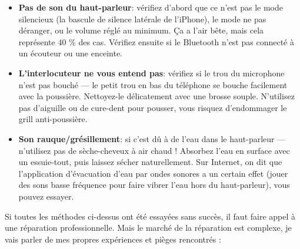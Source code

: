 \begin{itemize}
  \item \textbf{Pas de son du haut-parleur}: vérifiez d'abord que ce n'est pas le mode silencieux (la bascule de silence latérale de l'iPhone), le mode ne pas déranger, ou le volume réglé au minimum. Ça a l'air bête, mais cela représente 40 \% des cas. Vérifiez ensuite si le Bluetooth n'est pas connecté à un écouteur ou une enceinte.
  \item \textbf{L'interlocuteur ne vous entend pas}: vérifiez si le trou du microphone n'est pas bouché — le petit trou en bas du téléphone se bouche facilement avec la poussière. Nettoyez-le délicatement avec une brosse souple. N'utilisez pas d'aiguille ou de cure-dent pour pousser, vous risquez d'endommager le grill anti-poussière.
  \item \textbf{Son rauque/grésillement}: si c'est dû à de l'eau dans le haut-parleur — n'utilisez pas de sèche-cheveux à air chaud ! Absorbez l'eau en surface avec un essuie-tout, puis laissez sécher naturellement. Sur Internet, on dit que l'application d'évacuation d'eau par ondes sonores a un certain effet (jouer des sons basse fréquence pour faire vibrer l'eau hors du haut-parleur), vous pouvez essayer.
\end{itemize}


Si toutes les méthodes ci-dessus ont été essayées sans succès, il faut faire appel à une réparation professionnelle. Mais le marché de la réparation est complexe, je vais parler de mes propres expériences et pièges rencontrés :

